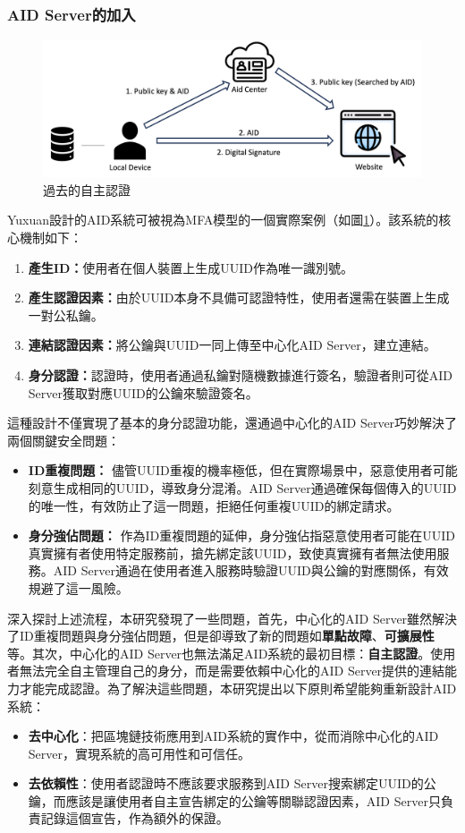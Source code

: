\subsubsection{AID Server的加入}
\begin{figure}
  \centering
  \includegraphics[width=\linewidth]{figures/old-aid-login.png}
  \caption{過去的自主認證}
  \label{fig:old-aid-login}
\end{figure}
Yuxuan設計的AID系統\cite{ntu-lin2014autonomous}可被視為MFA模型的一個實際案例（如圖\ref{fig:old-aid-login}）。該系統的核心機制如下：
\begin{enumerate}
  \item \textbf{產生ID：}使用者在個人裝置上生成UUID\cite{uuid}作為唯一識別號。
  \item \textbf{產生認證因素：}由於UUID本身不具備可認證特性，使用者還需在裝置上生成一對公私鑰。
  \item \textbf{連結認證因素：}將公鑰與UUID一同上傳至中心化AID Server，建立連結。
  \item \textbf{身分認證：}認證時，使用者通過私鑰對隨機數據進行簽名，驗證者則可從AID Server獲取對應UUID的公鑰來驗證簽名。
\end{enumerate}
這種設計不僅實現了基本的身分認證功能，還通過中心化的AID Server巧妙解決了兩個關鍵安全問題：
\begin{itemize}
  \item \textbf{ID重複問題：} 儘管UUID重複的機率極低，但在實際場景中，惡意使用者可能刻意生成相同的UUID，導致身分混淆。AID Server通過確保每個傳入的UUID的唯一性，有效防止了這一問題，拒絕任何重複UUID的綁定請求。
  \item \textbf{身分強佔問題：} 作為ID重複問題的延伸，身分強佔指惡意使用者可能在UUID真實擁有者使用特定服務前，搶先綁定該UUID，致使真實擁有者無法使用服務。AID Server通過在使用者進入服務時驗證UUID與公鑰的對應關係，有效規避了這一風險。
\end{itemize}

深入探討上述流程，本研究發現了一些問題，首先，中心化的AID Server雖然解決了ID重複問題與身分強佔問題，但是卻導致了新的問題如\textbf{單點故障}、\textbf{可擴展性}等。其次，中心化的AID Server也無法滿足AID系統的最初目標：\textbf{自主認證}。使用者無法完全自主管理自己的身分，而是需要依賴中心化的AID Server提供的連結能力才能完成認證。為了解決這些問題，本研究提出以下原則希望能夠重新設計AID系統：
\begin{itemize}
  \item \textbf{去中心化}：把區塊鏈技術應用到AID系統的實作中，從而消除中心化的AID Server，實現系統的高可用性和可信任。
  \item \textbf{去依賴性}：使用者認證時不應該要求服務到AID Server搜索綁定UUID的公鑰，而應該是讓使用者自主宣告綁定的公鑰等關聯認證因素，AID Server只負責記錄這個宣告，作為額外的保證。
\end{itemize}
